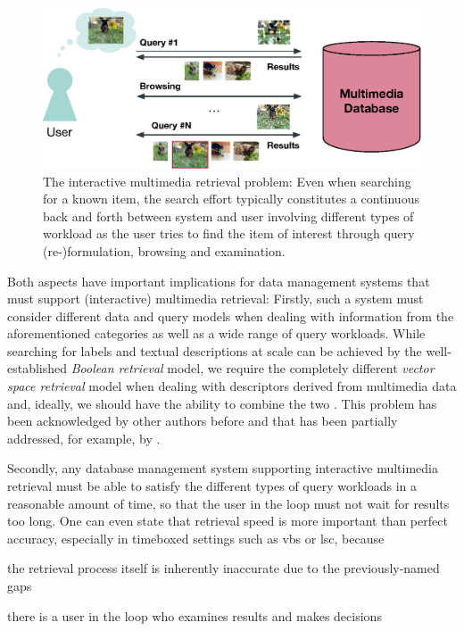 \begin{figure}[tb]
    \centering
    \includegraphics[width=\textwidth]{figures/mr-actual.eps}
    \caption{The interactive multimedia retrieval problem: Even when searching for a known item, the search effort typically constitutes a continuous back and forth between system and user involving different types of workload as the user tries to find the item of interest through query (re-)formulation, browsing and examination.}
    \label{figure:mr-actual}
\end{figure}
 
Both aspects have important implications for data management systems that must support (interactive) multimedia retrieval: Firstly, such a system must consider different data and query models when dealing with information from the aforementioned categories as well as a wide range of query workloads. While searching for labels and textual descriptions at scale can be achieved by the well-established \emph{Boolean retrieval} model, we require the completely different \emph{vector space retrieval} model when dealing with descriptors derived from multimedia data and, ideally, we should have the ability to combine the two \cite{Heller:2020Multi}. This problem has been acknowledged by other authors before \cite{Jonsson:2016Ten} and that has been partially addressed, for example, by \cite{Giangreco:2018Database,Giangreco:2016Adam,Wang:2021Milvus}.

Secondly, any database management system supporting interactive multimedia retrieval must be able to satisfy the different types of query workloads in a reasonable amount of time, so that the user in the loop must not wait for results too long. One can even state that retrieval speed is more important than perfect accuracy, especially in timeboxed settings such as \acrshort{vbs} or \acrshort{lsc}, because
\begin{enumerate*}[label=(\roman*), itemjoin={{, }}, itemjoin*={{, and, }}, after={{.}}]
    \item the retrieval process itself is inherently inaccurate due to the previously-named gaps
    \item there is a user in the loop who examines results and makes decisions
\end{enumerate*}

